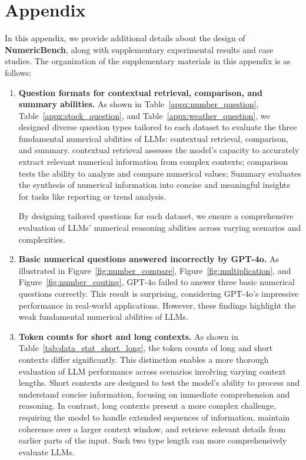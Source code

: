 \clearpage
 

\section{Appendix}
In this appendix, we provide additional details about the design of \textbf{NumericBench}, along with supplementary experimental results and case studies. The organization of the supplementary materials in this appendix is as follows:

\begin{enumerate}[leftmargin=*]
	
	\item \textbf{Question formats for contextual retrieval, comparison, and summary abilities.}  
As shown in Table~\ref{appx:number_question}, Table~\ref{appx:stock_question}, and Table~\ref{appx:weather_question}, 
we designed diverse question types tailored to each dataset to evaluate the three fundamental numerical abilities of LLMs: contextual retrieval, comparison, and summary. contextual retrieval  assesses the model’s capacity to accurately extract relevant numerical information from complex contexts; comparison tests the ability to analyze and compare numerical values;  Summary evaluates the synthesis of numerical information into concise and meaningful insights for tasks like reporting or trend analysis.


By designing tailored questions for each dataset, we ensure a comprehensive evaluation of LLMs’ numerical reasoning abilities across varying scenarios and complexities.
	\item \textbf{Basic numerical questions answered incorrectly by GPT-4o.}  
	As illustrated in Figure~\ref{fig:number_compare}, Figure~\ref{fig:multiplication}, and Figure~\ref{fig:number_couting}, GPT-4o failed to answer three basic numerical questions correctly. This result is surprising, considering GPT-4o's impressive performance in real-world applications. However, these findings highlight the weak fundamental numerical abilities of LLMs.
	
	\item \textbf{Token counts for short and long contexts.}  
	As shown in Table~\ref{tab:data_stat_short_long}, the token counts of long and short contexts differ significantly. This distinction enables a more thorough evaluation of LLM performance across scenarios involving varying context lengths. Short contexts are designed to test the model's ability to process and understand concise information, focusing on immediate comprehension and reasoning. In contrast, long contexts present a more complex challenge, requiring the model to handle extended sequences of information, maintain coherence over a larger context window, 
	and retrieve relevant details from earlier parts of the input. Such two type length can more comprehensively evaluate LLMs. 
	

\end{enumerate}
